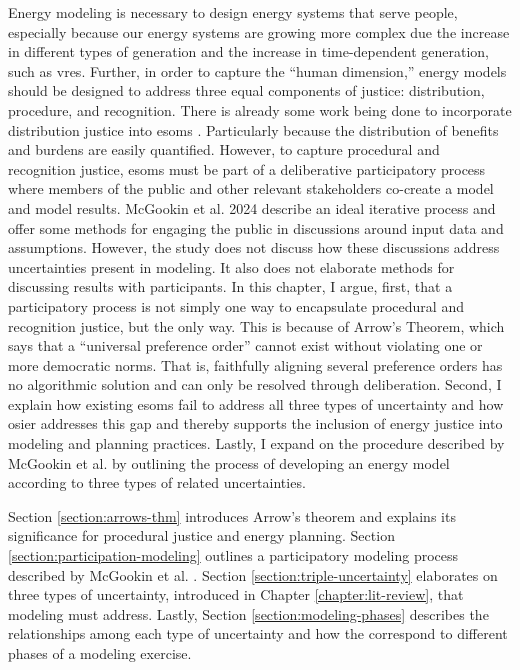 Energy modeling is necessary to design energy systems that serve people,
especially because our energy systems are growing more complex due the increase
in different types of generation and the increase in time-dependent generation,
such as \acfp{vre}. Further, in order to capture the ``human dimension,'' energy
models should be designed to address three equal components of justice:
distribution, procedure, and recognition. There is already some work being done
to incorporate distribution justice into \acp{esom}
\cite{neumann_near-optimal_2021,jafino_enabling_2021}. Particularly because the
distribution of benefits and burdens are easily quantified. However, to capture
procedural and recognition justice, \acp{esom} must be part of a deliberative
participatory process where members of the public and other relevant
stakeholders co-create a model and model results. McGookin et al. 2024 describe
an ideal iterative process \cite{mcgookin_advancing_2024} and offer some methods
for engaging the public in discussions around input data and assumptions.
However, the study does not discuss how these discussions address uncertainties
present in modeling. It also does not elaborate methods for discussing results
with participants. In this chapter, I argue, first, that a participatory process
is not simply one way to encapsulate procedural and recognition justice, but the
only way. This is because of Arrow's Theorem, which says that a ``universal
preference order'' cannot exist without violating one or more democratic norms.
That is, faithfully aligning several preference orders has no algorithmic
solution and can only be resolved through deliberation. Second, I explain how
existing \acp{esom} fail to address all three types of uncertainty and how
\ac{osier} addresses this gap and thereby supports the inclusion of energy
justice into modeling and planning practices. Lastly, I expand on the procedure
described by McGookin et al. \cite{mcgookin_advancing_2024} by outlining the
process of developing an energy model according to three types of related
uncertainties.

Section \ref{section:arrows-thm} introduces Arrow's theorem and explains its
significance for procedural justice and energy planning. Section
\ref{section:participation-modeling} outlines a participatory modeling process
described by McGookin et al. \cite{mcgookin_advancing_2024}. Section
\ref{section:triple-uncertainty} elaborates on three types of uncertainty,
introduced in Chapter \ref{chapter:lit-review}, that modeling must address.
Lastly, Section \ref{section:modeling-phases} describes the relationships among
each type of uncertainty and how the correspond to different phases of a
modeling exercise.


